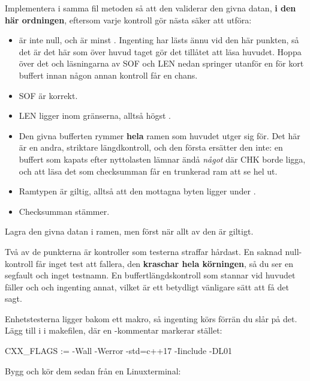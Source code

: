 Implementera i samma fil metoden  så att den validerar den givna
datan, \textbf{i den här ordningen}, eftersom varje kontroll gör nästa säker att utföra:
\begin{itemize}
  \item {} är inte null, och  är minst . Ingenting har lästs
    ännu vid den här punkten, så det är det här som över huvud taget gör det tillåtet att läsa
    huvudet. Hoppa över det och läsningarna av SOF och LEN nedan springer utanför en för kort
    buffert innan någon annan kontroll får en chans.
  \item SOF är korrekt.
  \item LEN ligger inom gränserna, alltså högst .
  \item Den givna bufferten rymmer \textbf{hela} ramen som huvudet utger sig för. Det här är en
    andra, striktare längdkontroll, och den första ersätter den inte: en buffert som kapats efter
    nyttolasten lämnar ändå \emph{något} där CHK borde ligga, och att läsa det som checksumman får en
    trunkerad ram att se hel ut.
  \item Ramtypen är giltig, alltså att den mottagna byten ligger under .
  \item Checksumman stämmer.
\end{itemize}

Lagra den givna datan i ramen, men först när allt av den är giltigt.

Två av de punkterna är kontroller som testerna straffar hårdast. En saknad null-kontroll får inget
test att fallera, den \textbf{kraschar hela körningen}, så du ser en segfault och inget testnamn. En
buffertlängdskontroll som stannar vid huvudet fäller  och
 och ingenting annat, vilket är ett betydligt vänligare sätt
att få det sagt.

Enhetstesterna ligger bakom ett makro, så ingenting körs förrän du slår på det. Lägg till
 i  i makefilen, där en -kommentar markerar stället:

\begin{makecode}
CXX_FLAGS := -Wall -Werror -std=c++17 -Iinclude -DL01
\end{makecode}

Bygg och kör dem sedan från en Linuxterminal:

